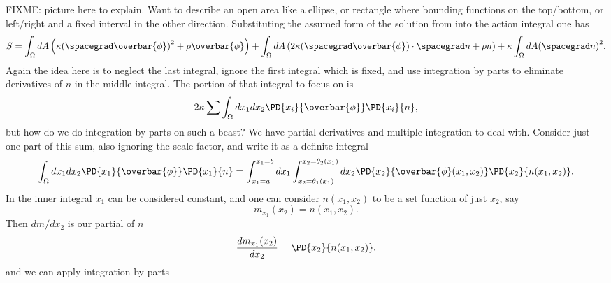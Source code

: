 FIXME: picture here to explain.  Want to describe an open area like a ellipse, or rectangle where bounding functions on the top/bottom, or left/right and a fixed interval
in the other direction.
%
%
Substituting the assumed form of the solution from  into the action integral  one has
%
\begin{equation}\label{eqn:lagrangianFieldDensity:1394}
S =
    \int_{\Omega} dA \left( \kappa {(\spacegrad \overbar{\phi})}^2 + \rho \overbar{\phi} \right)
+   \int_{\Omega} dA \left( 2 \kappa (\spacegrad \overbar{\phi}) \cdot \spacegrad n + \rho n \right)
+   \kappa \int_{\Omega} dA {(\spacegrad n)}^2.
\end{equation}
%
Again the idea here is to neglect the last integral, ignore the first integral which is fixed, and use integration by parts to eliminate derivatives of \(n\)
in the middle integral.  The portion of that integral to focus on is
%
\begin{equation}\label{eqn:lagrangianFieldDensity:1414}
2 \kappa \sum \int_{\Omega} dx_1 dx_2 \PD{x_i}{\overbar{\phi}} \PD{x_i}{n},
\end{equation}
%
but how do we do integration by parts on such a beast?  We have partial derivatives and multiple integration to deal with.  Consider just one part of this sum, also ignoring the scale factor, and write it as a definite integral
%
\begin{equation}\label{eqn:lagrangianFieldDensity:180}
\int_{\Omega} dx_1 dx_2 \PD{x_1}{\overbar{\phi}} \PD{x_1}{n}
= \int_{x_1=a}^{x_1=b} dx_1 \int_{x_2 = \theta_1(x_1)}^{x_2 = \theta_2(x_1)} dx_2 \PD{x_2}{\overbar{\phi}(x_1, x_2)} \PD{x_2}{n(x_1, x_2)} .
\end{equation}
%
In the inner integral \(x_1\) can be considered constant, and one can consider \(n(x_1, x_2)\) to be a set function of just \(x_2\), say
%
\begin{equation}\label{eqn:lagrangianFieldDensity:1434}
m_{x_1}(x_2) = n(x_1, x_2).
\end{equation}
%
Then \(dm/dx_2\) is our partial of \(n\)
%
\begin{equation}\label{eqn:lagrangianFieldDensity:1454}
\frac{d m_{x_1}(x_2)}{d x_2} = \PD{x_2}{n(x_1, x_2)}.
\end{equation}
%
and we can apply integration by parts

